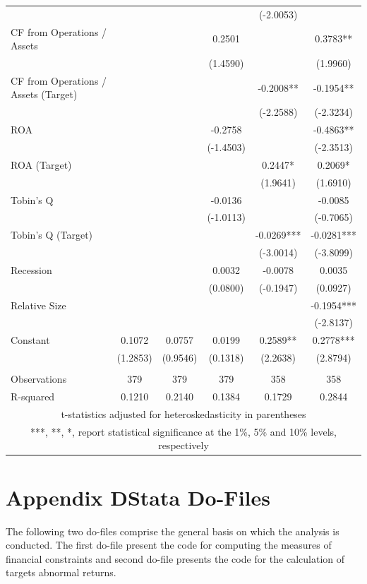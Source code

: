 \documentclass[12pt]{article}
\begin{document}
\begin{appendices}
\begin{table}[!htbp]
\begin{adjustbox}{max width=\textwidth}
\begin{tabular}{lccccc}
			&  &  &  & (-2.0053) &  \\
		   CF from Operations / Assets &  &  & 0.2501 &  & 0.3783** \\
			&  &  & (1.4590) &  & (1.9960) \\
		   CF from Operations / Assets (Target) &  &  &  & -0.2008** & -0.1954** \\
			&  &  &  & (-2.2588) & (-2.3234) \\
		   ROA &  &  & -0.2758 &  & -0.4863** \\
			&  &  & (-1.4503) &  & (-2.3513) \\
		   ROA (Target) &  &  &  & 0.2447* & 0.2069* \\
			&  &  &  & (1.9641) & (1.6910) \\
		   Tobin's Q &  &  & -0.0136 &  & -0.0085 \\
			&  &  & (-1.0113) &  & (-0.7065) \\
		   Tobin's Q (Target) &  &  &  & -0.0269*** & -0.0281*** \\
			&  &  &  & (-3.0014) & (-3.8099) \\
		   Recession &  &  & 0.0032 & -0.0078 & 0.0035 \\
			&  &  & (0.0800) & (-0.1947) & (0.0927) \\
		   Relative Size &  &  &  &  & -0.1954*** \\
			&  &  &  &  & (-2.8137) \\
		   Constant & 0.1072 & 0.0757 & 0.0199 & 0.2589** & 0.2778*** \\
			& (1.2853) & (0.9546) & (0.1318) & (2.2638) & (2.8794) \\
			&  &  &  &  &  \\
		   Observations & 379 & 379 & 379 & 358 & 358 \\
			R-squared & 0.1210 & 0.2140 & 0.1384 & 0.1729 & 0.2844 \\ \hline
			\multicolumn{6}{c}{ t-statistics adjusted for heteroskedasticity in parentheses} \\
			\multicolumn{6}{c}{ ***, **, *, report statistical significance at the 1\%, 5\% and 10\% levels, respectively}\\
		   \end{tabular}						
	\end{adjustbox}
\end{table}
\pagebreak


\section*{Appendix D\indent Stata Do-Files}
\noindent The following two do-files comprise the general basis on which the analysis is conducted. The first do-file present the code for computing the measures of financial constraints and second do-file presents the code for the calculation of targets abnormal returns. 



\end{appendices}
\end{document}
